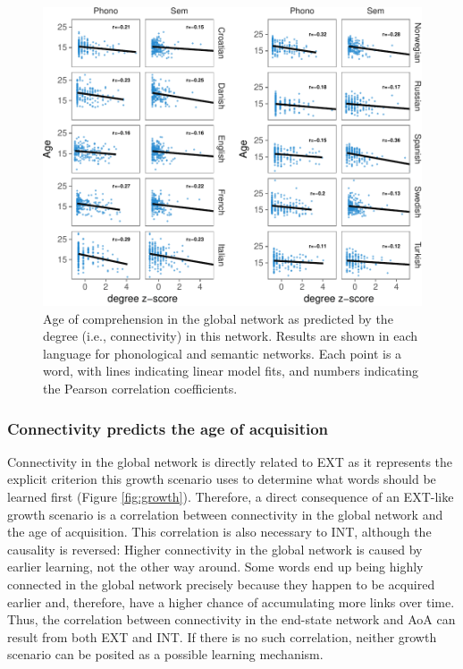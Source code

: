 \documentclass[english,floatsintext,man]{apa6}
\theoremstyle{definition}
\theoremstyle{definition}
\theoremstyle{definition}
\theoremstyle{remark}
\begin{document}
\begin{figure}[!h]
\includegraphics[width=\textwidth]{ms_files/figure-latex/corrComp-1} \caption{Age of comprehension in the global network as predicted by the degree (i.e., connectivity) in this network. Results are shown in each language for phonological and semantic networks. Each point is a word, with lines indicating linear model fits, and numbers indicating the Pearson correlation coefficients.}\label{fig:corrComp}
\end{figure}

\subsubsection{Connectivity predicts the age of
acquisition}\label{connectivity-predicts-the-age-of-acquisition}

Connectivity in the global network is directly related to EXT as it
represents the explicit criterion this growth scenario uses to determine
what words should be learned first (Figure \ref{fig:growth}). Therefore,
a direct consequence of an EXT-like growth scenario is a correlation
between connectivity in the global network and the age of acquisition.
This correlation is also necessary to INT, although the causality is
reversed: Higher connectivity in the global network is caused by earlier
learning, not the other way around. Some words end up being highly
connected in the global network precisely because they happen to be
acquired earlier and, therefore, have a higher chance of accumulating
more links over time. Thus, the correlation between connectivity in the
end-state network and AoA can result from both EXT and INT. If there is
no such correlation, neither growth scenario can be posited as a
possible learning mechanism.
\end{document}

